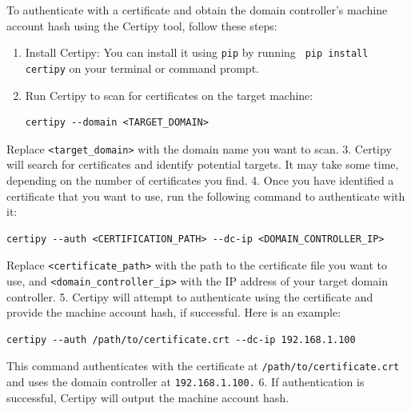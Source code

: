 To authenticate with a certificate and obtain the domain controller's machine account hash using the Certipy tool, follow these steps:
\begin{enumerate}
    \item Install Certipy: You can install it using \texttt{pip} by running \verb| pip install certipy| on your terminal or command prompt.
    \item Run Certipy to scan for certificates on the target machine:
\begin{notebox}
\begin{verbatim}
certipy --domain <TARGET_DOMAIN>
\end{verbatim}
\end{notebox}

\end{enumerate}
Replace \verb|<target_domain>| with the domain name you want to scan.
    3. Certipy will search for certificates and identify potential targets. It may take some time, depending on the number of certificates you find.
    4. Once you have identified a certificate that you want to use, run the following command to authenticate with it:
\begin{notebox}
\begin{verbatim}
certipy --auth <CERTIFICATION_PATH> --dc-ip <DOMAIN_CONTROLLER_IP>
\end{verbatim}
\end{notebox}
Replace \verb|<certificate_path>| with the path to the certificate file you want to use, and \verb|<domain_controller_ip>| with the IP address of your target domain controller.
    5. Certipy will attempt to authenticate using the certificate and provide the machine account hash, if successful. 
    Here is an example:
\begin{notebox}
\begin{verbatim}
certipy --auth /path/to/certificate.crt --dc-ip 192.168.1.100
\end{verbatim}
\end{notebox}
This command authenticates with the certificate at \verb|/path/to/certificate.crt| and uses the domain controller at \verb|192.168.1.100.|
    6. If authentication is successful, Certipy will output the machine account hash.
